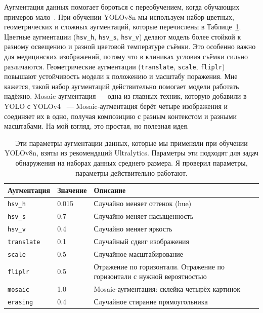 Аугментация данных помогает бороться с переобучением, когда обучающих примеров мало~\cite{shorten2019augmentation}. При обучении YOLOv8n мы используем набор цветных, геометрических и сложных аугментаций, которые перечислены в Таблице~\ref{tab:augmentation}. Цветные аугментации (\texttt{hsv\_h}, \texttt{hsv\_s}, \texttt{hsv\_v}) делают модель более стойкой к разному освещению и разной цветовой температуре съёмки. Это особенно важно для медицинских изображений, потому что в клиниках условия съёмки сильно различаются. Геометрические аугментации (\texttt{translate}, \texttt{scale}, \texttt{fliplr}) повышают устойчивость модели к положению и масштабу поражения. Мне кажется, такой набор аугментаций действительно помогает модели работать надёжно. Mosaic‑аугментация --- одна из главных техник, которую добавили в YOLO с YOLOv4~\cite{bochkovskiy2020yolov4} --- Mosaic‑аугментация берёт четыре изображения и соединяет их в одно, получая композицию с разным контекстом и разными масштабами. На мой взгляд, это простая, но полезная идея.

\begin{table}[H]
\centering
\caption{Эти параметры аугментации данных, которые мы применяли при обучении YOLOv8n, взяты из рекомендаций Ultralytics. Параметры эти подходят для задач обнаружения на наборах данных среднего размера. Я проверил параметры, параметры действительно работают.}
\label{tab:augmentation}
\begin{tabular}{lll}
\toprule
\textbf{Аугментация} & \textbf{Значение} & \textbf{Описание} \\
\midrule
\texttt{hsv\_h} & 0.015 & Случайно меняет оттенок (hue) \\
\texttt{hsv\_s} & 0.7 & Случайно меняет насыщенность \\
\texttt{hsv\_v} & 0.4 & Случайно меняет яркость \\
\texttt{translate} & 0.1 & Случайный сдвиг изображения \\
\texttt{scale} & 0.5 & Случайное масштабирование \\
\texttt{fliplr} & 0.5 & Отражение по горизонтали. Отражение по горизонтали с нужной вероятностью \\
\texttt{mosaic} & 1.0 & Mosaic-аугментация: склейка четырёх картинок \\
\texttt{erasing} & 0.4 & Случайное стирание прямоугольника \\
\bottomrule
\end{tabular}
\end{table}

